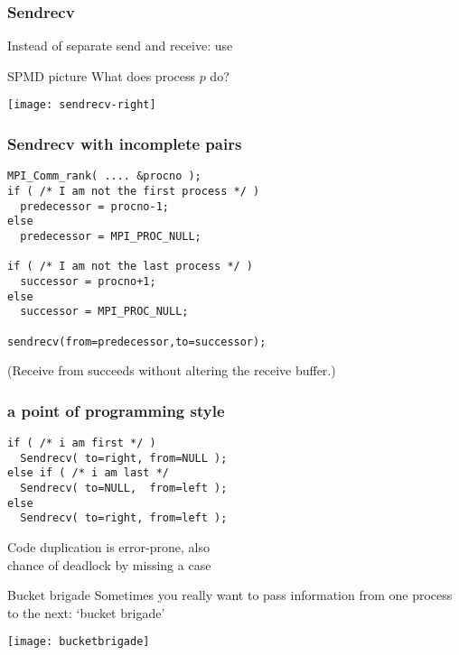 \begin{frame}[containsverbatim]\frametitle{Sendrecv}
  Instead of separate send and receive: use

\end{frame}

\begin{frame}{SPMD picture}
  What does process $p$ do?
  
  \texttt{[image: sendrecv-right]}
\end{frame}

\begin{frame}[containsverbatim]\frametitle{Sendrecv with incomplete pairs}
\lstset{language=C}
\begin{lstlisting}
MPI_Comm_rank( .... &procno );
if ( /* I am not the first process */ )
  predecessor = procno-1;
else
  predecessor = MPI_PROC_NULL;

if ( /* I am not the last process */ )
  successor = procno+1;
else
  successor = MPI_PROC_NULL;

sendrecv(from=predecessor,to=successor);  
\end{lstlisting}
(Receive from  succeeds without altering
the receive buffer.)
\end{frame}

\begin{frame}[containsverbatim]\frametitle{a point of programming style}
\lstset{language=C}
\begin{lstlisting}
if ( /* i am first */ )
  Sendrecv( to=right, from=NULL );
else if ( /* i am last */
  Sendrecv( to=NULL,  from=left );
else 
  Sendrecv( to=right, from=left );
\end{lstlisting}
Code duplication is error-prone, also\\
chance of deadlock by missing a case
\end{frame}

\begin{optexerciseframe}[rightsend]
  
\end{optexerciseframe}

\begin{exerciseframe}[sendrecv]
  
\end{exerciseframe}

\begin{frame}{Bucket brigade}
  Sometimes you really want to pass information from one process to
  the next: `bucket brigade'

  \texttt{[image: bucketbrigade]}
\end{frame}

